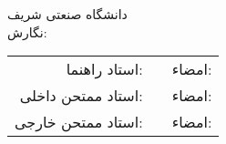 \thispagestyle{empty}
\begin{center}
	\Large{دانشگاه صنعتی شریف} \\
	\Large{\fadepart}
	\vskip 1cm
	\large{\fatype{} \falevel}
	\vskip 2cm
	\textbf{\Large{\fatitle}}
	\vskip 2cm
	نگارش: \faAuthor
{}
\end{center}
\vskip 2cm
\bgroup
\renewcommand{\arraystretch}{4.5}
\begin{center}
	\begin{tabular}{r p{4.5cm} p{5cm}}

		استاد راهنما:      & 
		\fasupervisor      & 
		امضاء:                \\ 
		استاد ممتحن داخلی: & 
		\momtaheninFirst   & 
		امضاء:                \\
		استاد ممتحن خارجی: & 
		\momtahenouFirst   & 
		امضاء:                \\
	\end{tabular}
\end{center}
\egroup